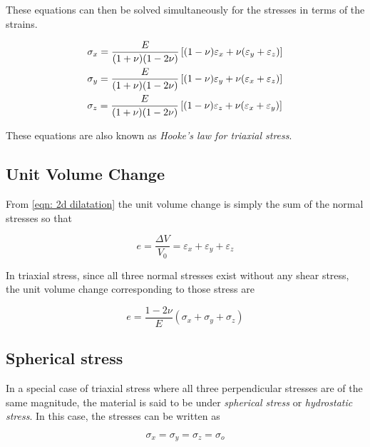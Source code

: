 \documentclass[
10pt,
a4paper,
openany,
svgnames,
]{book} %
\begin{document}
These equations can then be solved simultaneously for the stresses in terms of the strains.

\begin{equation}
  \begin{gathered}
    \sigma_x = \frac{E}{(1 + \nu )(1 - 2\nu )}\left[ (1 - \nu )\varepsilon_x + \nu (\varepsilon_y + \varepsilon_z) \right] \hfill \\
    \sigma_y = \frac{E}{(1 + \nu )(1 - 2\nu )}\left[ (1 - \nu )\varepsilon_y + \nu (\varepsilon_x + \varepsilon_z) \right] \hfill \\
    \sigma_z = \frac{E}{(1 + \nu )(1 - 2\nu )}\left[ (1 - \nu )\varepsilon_z + \nu (\varepsilon_x + \varepsilon_y) \right] \hfill \\ 
  \end{gathered}
\end{equation}

These equations are also known as \emph{Hooke’s law for triaxial stress}.

\subsection{Unit Volume Change}

From \cref{eqn: 2d dilatation} the unit volume change is simply the sum of the normal stresses so that

\begin{equation}
  e = \frac{\Delta V}{V_0} = \varepsilon_x + \varepsilon_y + \varepsilon _z
\end{equation}

In triaxial stress, since all three normal stresses exist without any shear stress, the unit volume change corresponding to those stress are

\begin{equation}
  e = \frac{1 - 2\nu}{E}(\sigma_x + \sigma_y + \sigma_z)
\end{equation}

\subsection{Spherical stress}

In a special case of triaxial stress where all three perpendicular stresses are of the same magnitude, the material is said to be under \emph{spherical stress} or \emph{hydrostatic stress}. In this case, the stresses can be written as

\[\sigma_x = \sigma_y = \sigma_z = \sigma_o\]
\end{document}
